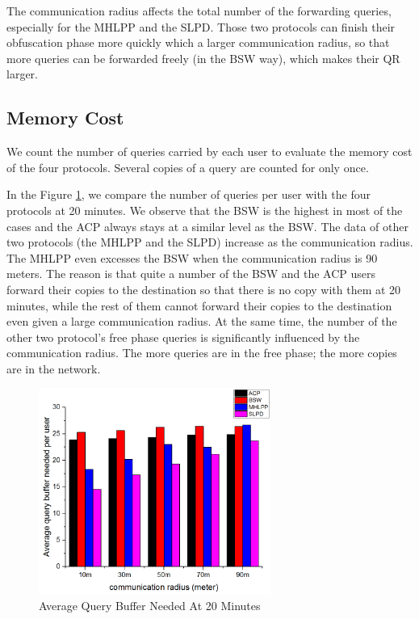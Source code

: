 \documentclass[conference]{IEEEtran}
\begin{document}
The communication radius affects the total number of the forwarding queries, especially for the MHLPP and the SLPD. Those two protocols can finish their obfuscation phase more quickly which a larger communication radius, so that more queries can be forwarded freely (in the BSW way), which makes their QR larger.

\subsection{ Memory Cost}

\noindent We count the number of queries carried by each user to evaluate the memory cost of the four protocols. Several copies of a query are counted for only once.

In the Figure \ref{fig:F419AverageQueryBufferNeededAt20Minutes}, we compare the number of queries per user with the four protocols at 20 minutes. We observe that the BSW is the highest in most of the cases and the ACP always stays at a similar level as the BSW. The data of other two protocols (the MHLPP and the SLPD) increase as the communication radius. The MHLPP even excesses the BSW when the communication radius is 90 meters. The reason is that quite a number of the BSW and the ACP users forward their copies to the destination so that there is no copy with them at 20 minutes, while the rest of them cannot forward their copies to the destination even given a large communication radius. At the same time, the number of the other two protocol's free phase queries is significantly influenced by the communication radius. The more queries are in the free phase; the more copies are in the network.

\begin{figure} [hbtp]
  \centering 
  \includegraphics[width=3in]{figures/F419AverageQueryBufferNeededAt20Minutes.png}
  \caption{Average Query Buffer Needed At 20 Minutes} 
  \label{fig:F419AverageQueryBufferNeededAt20Minutes} %
\end{figure}
\end{document}
